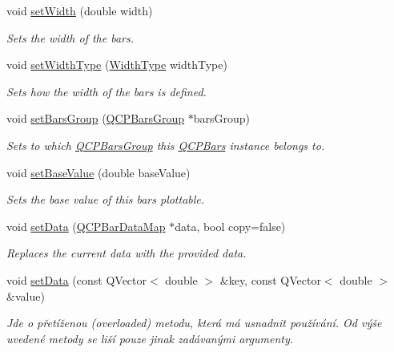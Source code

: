 \begin{DoxyCompactItemize}
\item 
void \hyperlink{classQCPBars_afec6116579d44d5b706e0fa5e5332507}{set\+Width} (double width)
\begin{DoxyCompactList}\small\item\em Sets the width of the bars. \end{DoxyCompactList}\item 
void \hyperlink{classQCPBars_adcaa3b41281bb2c0f7949b341592fcc0}{set\+Width\+Type} (\hyperlink{classQCPBars_a65dbbf1ab41cbe993d71521096ed4649}{Width\+Type} width\+Type)
\begin{DoxyCompactList}\small\item\em Sets how the width of the bars is defined. \end{DoxyCompactList}\item 
void \hyperlink{classQCPBars_aedd1709061f0b307c47ddb45e172ef9a}{set\+Bars\+Group} (\hyperlink{classQCPBarsGroup}{Q\+C\+P\+Bars\+Group} $\ast$bars\+Group)
\begin{DoxyCompactList}\small\item\em Sets to which \hyperlink{classQCPBarsGroup}{Q\+C\+P\+Bars\+Group} this \hyperlink{classQCPBars}{Q\+C\+P\+Bars} instance belongs to. \end{DoxyCompactList}\item 
void \hyperlink{classQCPBars_a574ec7eb7537566df1a28ff085d75623}{set\+Base\+Value} (double base\+Value)
\begin{DoxyCompactList}\small\item\em Sets the base value of this bars plottable. \end{DoxyCompactList}\item 
void \hyperlink{classQCPBars_aa3435aab19e0a49e4e7b41bd36a8d96b}{set\+Data} (\hyperlink{qcustomplot_8h_aa846c77472cae93def9f1609d0c57191}{Q\+C\+P\+Bar\+Data\+Map} $\ast$data, bool copy=false)
\begin{DoxyCompactList}\small\item\em Replaces the current data with the provided {\itshape data}. \end{DoxyCompactList}\item 
void \hyperlink{classQCPBars_a3efded5df4a82ecb201f7c28099fa2e5}{set\+Data} (const Q\+Vector$<$ double $>$ \&key, const Q\+Vector$<$ double $>$ \&value)
\begin{DoxyCompactList}\small\item\em Jde o přetíženou (overloaded) metodu, která má usnadnit používání. Od výše uvedené metody se liší pouze jinak zadávanými argumenty.


\end{DoxyCompactList}
\end{DoxyCompactItemize}
